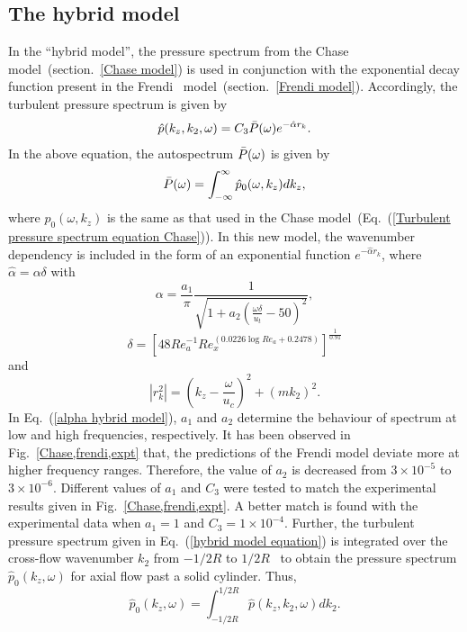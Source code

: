 \documentclass[twocolumn,10pt]{asme2ej}
\begin{document}
\subsection{The hybrid model}
In the \enquote{hybrid model}, the pressure spectrum from the Chase~\cite{Chase1981} model~(section.~\ref{Chase model}) is used in conjunction with the exponential decay function present in the Frendi~\cite{frendi2020} model~(section.~\ref{Frendi model}). Accordingly, the turbulent pressure spectrum is given by
\begin{equation}\label{hybrid model equation}
    \hat{p}(k_{z},k_{2},\omega) = C_{3}\Bar{P}(\omega)e^{-\hat{\alpha}r_{k}}.
\end{equation}
In the above equation, the autospectrum $\Bar{P}(\omega)$ is given by
\begin{equation}\label{autospectrum equation}
    \Bar{P}(\omega) = \int^{\infty}_{-\infty}\hat{p}_{0}(\omega,k_{z})dk_{z},
\end{equation}
where $\hat{p}_{0}(\omega,k_{z})$ is the same as that used in the Chase model~(Eq.~(\ref{Turbulent pressure spectrum equation Chase})). In this new model, the wavenumber dependency is included in the form of an exponential function $e^{-\hat{\alpha}r_{k}}$, where $\hat{\alpha} = \alpha\delta$ with
\begin{equation}\label{alpha hybrid model}
   \alpha = \frac{a_1}{\pi}\frac{1}{\sqrt{1+a_2(\frac{\omega \delta}{u_{t}}-50)^{2}}},
\end{equation}
\begin{equation}
    \delta = [48Re_a^{-1}Re_x^{(0.0226\log{Re_a}+0.2478)}]^{\frac{1}{0.91}}
\end{equation}
and
\begin{equation}
    |{r_{k}^{2}}| = (k_{z} - \frac{\omega}{u_{c}})^{2} + (mk_{2})^{2}.
\end{equation}
In Eq.~(\ref{alpha hybrid model}), $a_1$ and $a_2$ determine the behaviour of spectrum at low and high frequencies, respectively. It has been observed in Fig.~\ref{Chase,frendi,expt} that, the predictions of the Frendi model deviate more at higher frequency ranges. Therefore, the value of $a_2$ is decreased from $3\times10^{-5}$ to $3\times10^{-6}$. Different values of $a_1$ and $C_3$ were tested to match the experimental results given in Fig.~\ref{Chase,frendi,expt}. A better match is found with the experimental data when $a_1 = 1$ and $C_3=1\times10^{-4}$. Further, the turbulent pressure spectrum given in Eq.~(\ref{hybrid model equation}) is integrated over the cross-flow wavenumber $k_2$ from $-1/2R$ to $1/2R$~\cite{Chase1981} to obtain the pressure spectrum $\hat{p}_0(k_z,\omega)$ for axial flow past a solid cylinder. 
Thus,
\begin{equation}\label{hybrid model turbulent pressure}
    \hat{p}_0(k_{z},\omega) = \int_{-1/2R}^{1/2R}\hat{p}(k_{z},k_{2},\omega)dk_{2}.
\end{equation}
\end{document}
